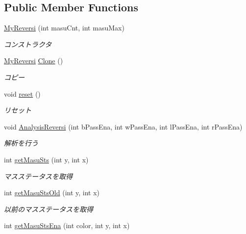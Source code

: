 \subsection*{Public Member Functions}
\begin{DoxyCompactItemize}
\item 
\hyperlink{class_reversi4color_wpf_1_1_my_reversi_a0aff82171fb2635b92c341d975ef0821}{My\+Reversi} (int masu\+Cnt, int masu\+Max)
\begin{DoxyCompactList}\small\item\em コンストラクタ \end{DoxyCompactList}\item 
\hyperlink{class_reversi4color_wpf_1_1_my_reversi}{My\+Reversi} \hyperlink{class_reversi4color_wpf_1_1_my_reversi_aef07eb98636639a953974d267ed8dceb}{Clone} ()
\begin{DoxyCompactList}\small\item\em コピー \end{DoxyCompactList}\item 
void \hyperlink{class_reversi4color_wpf_1_1_my_reversi_af80d2c161f9734e13a6b37ca0ce852dc}{reset} ()
\begin{DoxyCompactList}\small\item\em リセット \end{DoxyCompactList}\item 
void \hyperlink{class_reversi4color_wpf_1_1_my_reversi_a228ec7c4ed93d7207aebb824906ccc2e}{Analysis\+Reversi} (int b\+Pass\+Ena, int w\+Pass\+Ena, int l\+Pass\+Ena, int r\+Pass\+Ena)
\begin{DoxyCompactList}\small\item\em 解析を行う \end{DoxyCompactList}\item 
int \hyperlink{class_reversi4color_wpf_1_1_my_reversi_a4e1068b67037558148ae886c6d3ef6d8}{get\+Masu\+Sts} (int y, int x)
\begin{DoxyCompactList}\small\item\em マスステータスを取得 \end{DoxyCompactList}\item 
int \hyperlink{class_reversi4color_wpf_1_1_my_reversi_aa034cb7e21ff293bb62e8988db2f9d03}{get\+Masu\+Sts\+Old} (int y, int x)
\begin{DoxyCompactList}\small\item\em 以前のマスステータスを取得 \end{DoxyCompactList}\item 
int \hyperlink{class_reversi4color_wpf_1_1_my_reversi_a9bd7042ad264b2ffaa0a69aadef6a7f9}{get\+Masu\+Sts\+Ena} (int color, int y, int x)

\end{DoxyCompactItemize}

